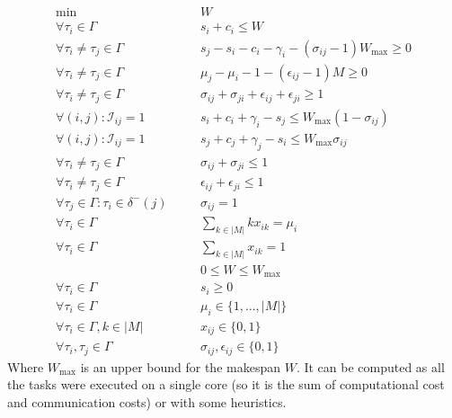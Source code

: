 \begin{align}
\min    										& \quad & W \label{eq:milp1}\\
\forall\tau_i\in\Gamma							&  &  s_i+c_i\leq W \label{eq:milp2}\\
\forall\tau_i\neq\tau_j\in\Gamma				&  &  s_j-s_i-c_i-\gamma_i-(\sigma_{ij}-1)W_{\max}\geq 0 \label{eq:milp3}\\
\forall\tau_i\neq\tau_j\in\Gamma				&  &  \mu_j-\mu_i-1-(\epsilon_{ij}-1)M\geq 0 \label{eq:milp4}\\
\forall\tau_i\neq\tau_j\in\Gamma				&  &  \sigma_{ij}+\sigma_{ji}+\epsilon_{ij}+\epsilon_{ji}\geq 1 \label{eq:milp5}\\
\forall(i,j):\mathcal{I}_{ij}=1 				&  &  s_i+c_i+\gamma_i-s_j\leq W_{\max}(1-\sigma_{ij}) \label{eq:milp6}\\
\forall(i,j):\mathcal{I}_{ij}=1					&  &  s_j+c_j+\gamma_j-s_i\leq W_{\max}\sigma_{ij} \label{eq:milp7}\\
\forall\tau_i\neq\tau_j\in\Gamma				&  &  \sigma_{ij}+\sigma_{ji}\leq 1 \label{eq:milp8}\\
\forall\tau_i\neq\tau_j\in\Gamma				&  &  \epsilon_{ij}+\epsilon_{ji}\leq 1 \label{eq:milp9}\\
\forall\tau_j\in\Gamma:\tau_i\in\delta^-(j)		&  &  \sigma_{ij}=1 \label{eq:milp10}\\
\forall\tau_i\in\Gamma 							&  & \sum_{k\in |M|} kx_{ik}=\mu_i \label{eq:milp11}\\
\forall\tau_i\in\Gamma 							&  & \sum_{k\in |M|} x_{ik}=1 \label{eq:milp12}\\
												&  & 0\leq W \leq W_{\max} \label{eq:milp13}\\
\forall\tau_i\in\Gamma 							&  & s_i\geq 0 \label{eq:milp14}\\
\forall\tau_i\in\Gamma 							& & \mu_i\in \{1,...,|M|\} \label{eq:milp15}\\
\forall\tau_i\in\Gamma,k\in |M|					& & x_{ij}\in\{0,1\} \label{eq:milp16}\\
\forall\tau_i,\tau_j\in\Gamma					& & \sigma_{ij},\epsilon_{ij} \in\{0,1\} \label{eq:milp17}
\end{align}
Where $W_{\max}$ is an upper bound for the makespan $W$. It can be computed as all the tasks were executed on a single core (so it is the sum of computational cost and communication costs) or with some heuristics. 
